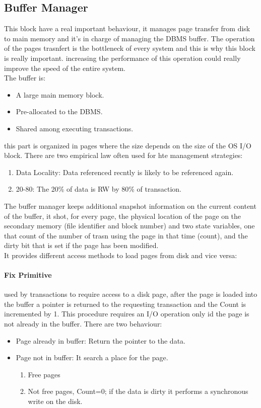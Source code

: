 \documentclass[12pt]{article}
\begin{document}
\subsection{Buffer Manager}
This block have a real important behaviour, it manages page transfer from disk to main memory and it's in charge of managing the DBMS buffer. The operation of the pages trasnfert is the bottleneck of every system and this is why this block is really important. increasing the performance of this operation could really improve the speed of the entire system.\\
The buffer is:
\begin{itemize}
  \item A large main memory block.
  \item Pre-allocated to the DBMS.
  \item Shared among executing transactions.
\end{itemize}
this part is organized in pages where the size depends on the size of the OS I/O block. There are two empirical law often used for hte management strategies:
\begin{enumerate}
  \item Data Locality: Data referenced recntly is likely to be referenced again.
  \item 20-80: The 20\% of data is RW by 80\% of transaction.
\end{enumerate}
The buffer manager keeps additional snapshot information on the current content of the buffer, it shot, for every page, the physical location of the page on the secondary memory (file identifier and block number) and two state variables, one that count of the number of trasn using the page in that time (count), and the dirty bit that is set if the page has been modified.\\ %
It provides different access methods to load pages from disk and vice versa:
\paragraph{Fix Primitive} used by transactions to require access to a disk page, after the page is loaded into the buffer a pointer is returned to the requesting transaction and the Count is incremented by 1. This procedure requires an I/O operation only id the page is not already in the buffer. There are two behaviour:
\begin{itemize}
  \item Page already in buffer: Return the pointer to the data.
  \item Page not in buffer: It search a place for the page.
  \begin{enumerate}
    \item Free pages
    \item Not free pages, Count=0; if the data is dirty it performs a synchronous write on the disk.
  \end{enumerate}
\end{itemize}
\end{document}
